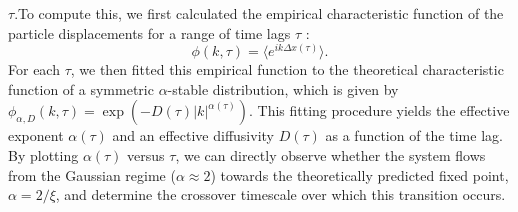 \documentclass[]{article}
\begin{document}
$\tau$.To compute this, we first calculated the empirical characteristic function of the particle displacements for a range of time lags $\tau$  \citep{kaiser2026limittheoremsempiricaldistribution}:\begin{equation}\phi(k, \tau) = \langle e^{ik\Delta x(\tau)} \rangle.\end{equation}For each $\tau$, we then fitted this empirical function to the theoretical characteristic function of a symmetric $\alpha$-stable distribution, which is given by $\phi_{\alpha, D}(k, \tau) = \exp(-D(\tau)|k|^{\alpha(\tau)})$. This fitting procedure yields the effective exponent $\alpha(\tau)$ and an effective diffusivity $D(\tau)$ as a function of the time lag. By plotting $\alpha(\tau)$ versus $\tau$, we can directly observe whether the system flows from the Gaussian regime ($\alpha \approx 2$) towards the theoretically predicted fixed point, $\alpha = 2/\xi$, and determine the crossover timescale over which this transition occurs.
\end{document}
